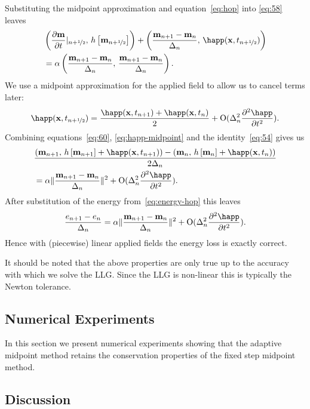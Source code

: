Substituting the midpoint approximation and equation~\eqref{eq:hop} into \eqref{eq:58} leaves
\begin{align}
  \label{eq:60}
  &\ip{ \pd{\mv}{t} \lvert_{n+\half}}{\hop \left[\mv_{n+\half} \right]} + \ip{\frac{\mv_{n+1} - \mv_n}{\dtn}}{\happ(\xv,t_{n+\half})} \\
  &= \dampc \ip{\frac{\mv_{n+1} - \mv_n}{\dtn}}{\frac{\mv_{n+1} - \mv_n}{\dtn}}.
\end{align}
We use a midpoint approximation for the applied field to allow us to cancel terms later:
\begin{equation}
  \label{eq:happ-midpoint}
  \happ(\xv,t_{n+\half}) = \frac{\happ(\xv, t_{n+1}) + \happ(\xv, t_n)}{2} + \order{\dtn^2 \spd{\happ}{t}}.
\end{equation}
Combining equations~\eqref{eq:60}, \eqref{eq:happ-midpoint} and the identity~\eqref{eq:54} gives us
\begin{align}
  &\frac{\ip{\mv_{n+1}}{\hop \left[\mv_{n+1} \right] + \happ(\xv, t_{n+1})}
    - \ip{\mv_{n}}{\hop \left[\mv_{n} \right] + \happ(\xv, t_n)}
    }{2\dtn} \notag\\
  &= \dampc \norm{\frac{\mv_{n+1} - \mv_n}{\dtn}}^2
  + \order{\dtn^2 \spd{\happ}{t}}.
\end{align}
After substitution of the energy from~\eqref{eq:energy-hop} this leaves
\begin{equation}
  \frac{\e_{n+1} - \e_n}{\dtn}
  = \dampc \norm{\frac{\mv_{n+1} - \mv_n}{\dtn}}^2
  + \order{\dtn^2 \spd{\happ}{t}}.
\end{equation}
Hence with (piecewise) linear applied fields the energy loss is exactly correct.

It should be noted that the above properties are only true up to the accuracy with which we solve the LLG. Since the LLG is non-linear this is typically the Newton tolerance.


\subsection{Numerical Experiments}

In this section we present numerical experiments showing that the adaptive midpoint method retains the conservation properties of the fixed step midpoint method.

\subsection{Discussion}

